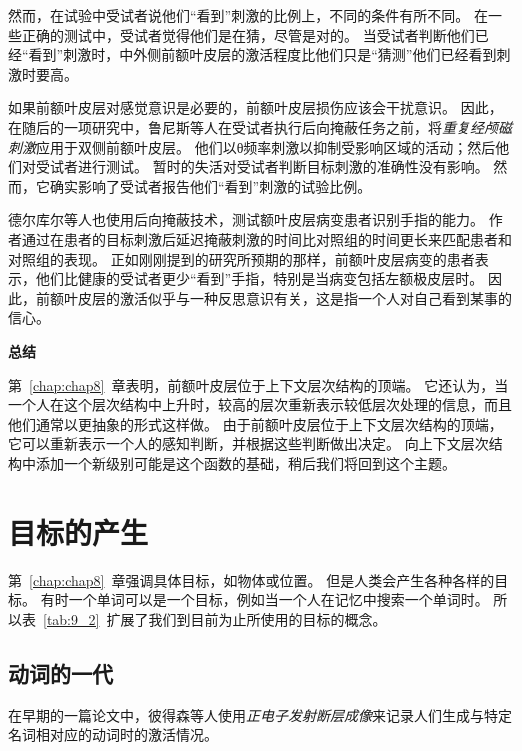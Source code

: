 然而，在试验中受试者说他们“看到”刺激的比例上，不同的条件有所不同。
在一些正确的测试中，受试者觉得他们是在猜，尽管是对的。
当受试者判断他们已经“看到”刺激时，中外侧前额叶皮层的激活程度比他们只是“猜测”他们已经看到刺激时要高。
\par


如果前额叶皮层对感觉意识是必要的，前额叶皮层损伤应该会干扰意识。
因此，在随后的一项研究中，鲁尼斯等人\cite{rounis2010theta}在受试者执行后向掩蔽任务之前，将\textit{重复经颅磁刺激}应用于双侧前额叶皮层。
他们以θ频率刺激以抑制受影响区域的活动；然后他们对受试者进行测试\cite{huang2005theta}。
暂时的失活对受试者判断目标刺激的准确性没有影响。
然而，它确实影响了受试者报告他们“看到”刺激的试验比例。
\par


德尔库尔等人\cite{del2009causal}也使用后向掩蔽技术，测试额叶皮层病变患者识别手指的能力。
作者通过在患者的目标刺激后延迟掩蔽刺激的时间比对照组的时间更长来匹配患者和对照组的表现。
正如刚刚提到的研究所预期的那样，前额叶皮层病变的患者表示，他们比健康的受试者更少“看到”手指，特别是当病变包括左额极皮层时。
因此，前额叶皮层的激活似乎与一种反思意识有关，这是指一个人对自己看到某事的信心。
\par


\textbf{总结}
\par

第~\ref{chap:chap8}~章表明，前额叶皮层位于上下文层次结构的顶端。
它还认为，当一个人在这个层次结构中上升时，较高的层次重新表示较低层次处理的信息，而且他们通常以更抽象的形式这样做。
由于前额叶皮层位于上下文层次结构的顶端，它可以重新表示一个人的感知判断，并根据这些判断做出决定。
向上下文层次结构中添加一个新级别可能是这个函数的基础，稍后我们将回到这个主题。



\section{目标的产生}
\par

第~\ref{chap:chap8}~章强调具体目标，如物体或位置。
但是人类会产生各种各样的目标。
有时一个单词可以是一个目标，例如当一个人在记忆中搜索一个单词时。
所以表~\ref{tab:9_2}~扩展了我们到目前为止所使用的目标的概念。



\subsection{动词的一代}
\par
在早期的一篇论文中，彼得森等人\cite{petersen1988positron}使用\textit{正电子发射断层成像}来记录人们生成与特定名词相对应的动词时的激活情况。
\par

